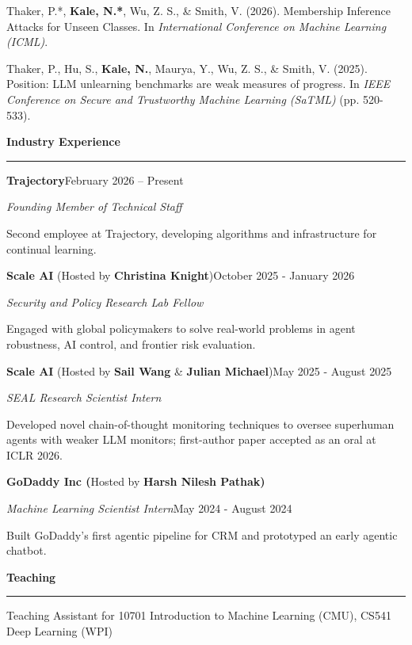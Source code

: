 \documentclass[10pt,letterpaper]{article}
\newcommand{\cvsection}[1]{%
  \vspace{6.5pt}%
  {\bfseries #1}\par
  \vspace{1.2pt}\hrule\vspace{11.6pt}}
\newcommand{\lr}[2]{\noindent #1\hfill #2\par}
\newcommand{\entrygap}{\vspace{5.8pt}}
\newenvironment{pubgroup}[2][5.5pt]{%
  \vspace{#1}{\itshape #2}\par\vspace{0.5pt}%
  \fontsize{10}{12}\selectfont}{\par}
\newcommand{\pub}[2]{[#1] #2\par}
\begin{document}
\begin{pubgroup}{Privacy and Auditing}
\pub{4}{Thaker, P.*, \textbf{Kale, N.*}, Wu, Z. S., \& Smith, V. (2026). Membership Inference Attacks for Unseen Classes. In \textit{International Conference on Machine Learning (ICML)}.}
\pub{5}{Thaker, P., Hu, S., \textbf{Kale, N.}, Maurya, Y., Wu, Z. S., \& Smith, V. (2025). Position: LLM unlearning benchmarks are weak measures of progress. In \textit{IEEE Conference on Secure and Trustworthy Machine Learning (SaTML)} (pp. 520-533).}
\end{pubgroup}

\cvsection{Industry Experience}

\lr{\textbf{Trajectory}}{February 2026 -- Present}
\textit{Founding Member of Technical Staff}\par
Second employee at Trajectory, developing algorithms and infrastructure for continual learning.\par

\entrygap
\lr{\textbf{Scale AI} (Hosted by \textbf{Christina Knight})}{October 2025 - January 2026}
\textit{Security and Policy Research Lab Fellow}\par
Engaged with global policymakers to solve real-world problems in agent robustness, AI control, and frontier risk evaluation.\par

\entrygap
\lr{\textbf{Scale AI} (Hosted by \textbf{Sail Wang} \& \textbf{Julian Michael})}{May 2025 - August 2025}
\textit{SEAL Research Scientist Intern}\par
Developed novel chain-of-thought monitoring techniques to oversee superhuman agents with weaker LLM monitors; first-author paper accepted as an oral at ICLR 2026.\par

\entrygap
\textbf{GoDaddy Inc (}Hosted by \textbf{Harsh Nilesh Pathak)}\par
\lr{\textit{Machine Learning Scientist Intern}}{May 2024 - August 2024}
Built GoDaddy's first agentic pipeline for CRM and prototyped an early agentic chatbot.\par

\cvsection{Teaching}

Teaching Assistant for 10701 Introduction to Machine Learning (CMU), CS541 Deep Learning (WPI)\par
\end{document}
